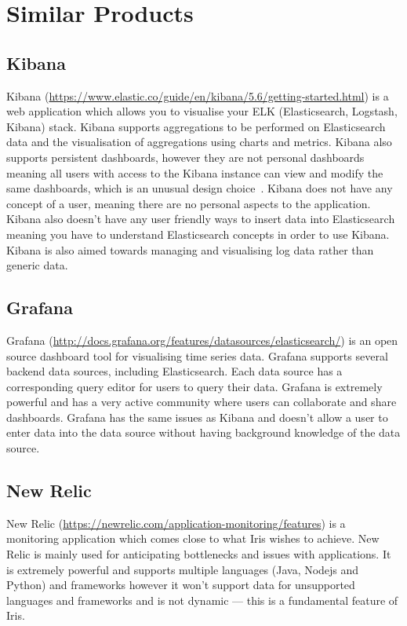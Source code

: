 \documentclass[12pt,a4paper,titlepage]{report}
\begin{document}
\section{Similar Products}

\subsection{Kibana}

Kibana (\url{https://www.elastic.co/guide/en/kibana/5.6/getting-started.html}) is a web application which allows you to visualise your ELK (Elasticsearch, Logstash, Kibana) stack. Kibana supports aggregations to be performed on Elasticsearch data and the visualisation of aggregations using charts and metrics. Kibana also supports persistent dashboards, however they are not personal dashboards meaning all users with access to the Kibana instance can view and modify the same dashboards, which is an unusual design choice~\parencite{Logz.io}. Kibana does not have any concept of a user, meaning there are no personal aspects to the application. Kibana also doesn't have any user friendly ways to insert data into Elasticsearch meaning you have to understand Elasticsearch concepts in order to use Kibana. Kibana is also aimed towards managing and visualising log data rather than generic data. 

\subsection{Grafana}

Grafana (\url{http://docs.grafana.org/features/datasources/elasticsearch/}) is an open source dashboard tool for visualising time series data. Grafana supports several backend data sources, including Elasticsearch. Each data source has a corresponding query editor for users to query their data. Grafana is extremely powerful and has a very active community where users can collaborate and share dashboards. Grafana has the same issues as Kibana and doesn't allow a user to enter data into the data source without having background knowledge of the data source.

\subsection{New Relic}

New Relic (\url{https://newrelic.com/application-monitoring/features}) is a monitoring application which comes close to what Iris wishes to achieve. New Relic is mainly used for anticipating bottlenecks and issues with applications. It is extremely powerful and supports multiple languages (Java, Nodejs and Python) and frameworks however it won't support data for unsupported languages and frameworks and is not dynamic --- this is a fundamental feature of Iris.
\end{document}
